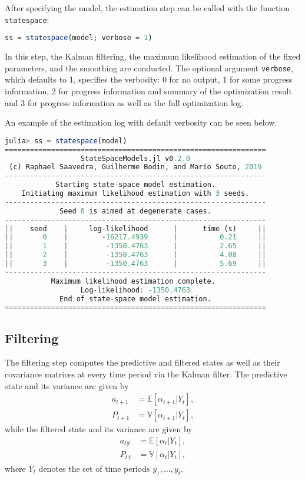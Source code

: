 \documentclass{juliacon}
\begin{document}
After specifying the model, the estimation step can be called with the function \texttt{statespace}:
%
\begin{lstlisting}[language = Julia]
ss = statespace(model; verbose = 1)
\end{lstlisting}

In this step, the Kalman filtering, the maximum likelihood estimation of the fixed parameters, and the smoothing are conducted. The optional argument \texttt{verbose}, which defaults to 1, specifies the verbosity: 0 for no output, 1 for some progress information, 2 for progress information and summary of the optimization result and 3 for progress information as well as the full optimization log.

An example of the estimation log with default verbosity can be seen below.
%
\begin{lstlisting}[language = Julia]
julia> ss = statespace(model)
==============================================================
                  StateSpaceModels.jl v0.2.0
 (c) Raphael Saavedra, Guilherme Bodin, and Mario Souto, 2019
--------------------------------------------------------------
            Starting state-space model estimation.
    Initiating maximum likelihood estimation with 3 seeds.
--------------------------------------------------------------
             Seed 0 is aimed at degenerate cases.
--------------------------------------------------------------
||    seed    |     log-likelihood      |      time (s)     ||
||       0    |        -16217.4939      |          0.21     ||
||       1    |         -1350.4763      |          2.65     ||
||       2    |         -1350.4763      |          4.08     ||
||       3    |         -1350.4763      |          5.69     ||
--------------------------------------------------------------
           Maximum likelihood estimation complete.
                  Log-likelihood: -1350.4763
             End of state-space model estimation.
==============================================================
\end{lstlisting}

\subsection{Filtering}

The filtering step computes the predictive and filtered states as well as their covariance matrices at every time period via the Kalman filter. The predictive state and its variance are given by
%
\begin{align}
    a_{t+1} &= \mathbb{E}[\alpha_{t+1} | Y_{t}], \\
    P_{t+1} &= \mathbb{V}[\alpha_{t+1} | Y_{t}],
\end{align}
%
while the filtered state and its variance are given by
%
\begin{align}
    a_{t|t} &= \mathbb{E}[\alpha_{t} | Y_{t}], \\
    P_{t|t} &= \mathbb{V}[\alpha_{t} | Y_{t}],
\end{align}
%
where $Y_{t}$ denotes the set of time periods $y_{1}, \dots, y_{t}$.
\end{document}
